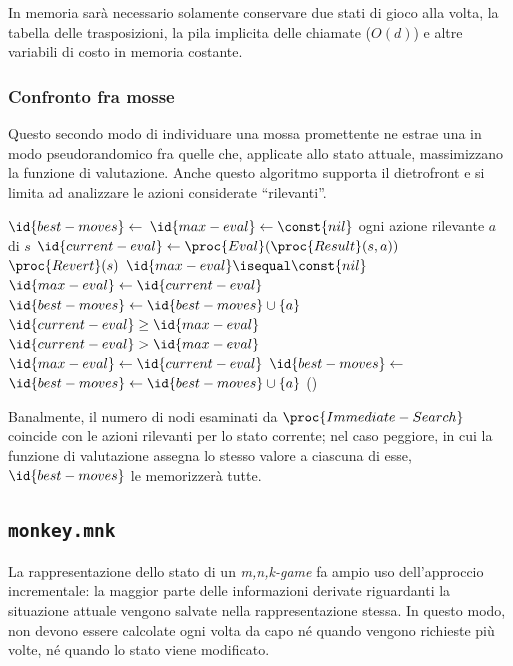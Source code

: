 \documentclass{article}
\begin{document}
In memoria sarà necessario solamente conservare due stati di gioco alla volta,
la tabella delle trasposizioni, la pila implicita delle chiamate ($O(d)$) e
altre variabili di costo in memoria costante.

\subsubsection{Confronto fra mosse}

Questo secondo modo di individuare una mossa promettente ne estrae una in modo
pseudorandomico fra quelle che, applicate allo stato attuale, massimizzano la
funzione di valutazione. Anche questo algoritmo supporta il dietrofront e si
limita ad analizzare le azioni considerate ``rilevanti''.

\begin{codebox}
  \li  $\id{best-moves} \gets$
       {\emph{}}
  \li  $\id{max-eval} \gets \const{nil}$
  \li \For ogni azione rilevante $a$ di $s$
  \li   \Do
          $\id{current-eval} \gets \proc{Eval}(\proc{Result}(s, a))$
  \li     $\proc{Revert}(s)$
  \li     \If $\id{max-eval} \isequal \const{nil}$
  \li       \Then
              $\id{max-eval} \gets \id{current-eval}$
  \li         $\id{best-moves} \gets \id{best-moves} \cup \{ a \}$
  \li     \ElseIf $\id{current-eval} \geq \id{max-eval}$
  \li       \Then
              \If $\id{current-eval} > \id{max-eval}$
  \li           \Then
                  $\id{max-eval} \gets \id{current-eval}$
  \li             $\id{best-moves} \gets$
                  {\emph{}}
                \End
  \li         $\id{best-moves} \gets \id{best-moves} \cup \{ a \}$
          \End
        \End
  \li  \Return {}()
\end{codebox}

Banalmente, il numero di nodi esaminati da $\proc{Immediate-Search}$ coincide
con le azioni rilevanti per lo stato corrente; nel caso peggiore, in cui la
funzione di valutazione assegna lo stesso valore a ciascuna di esse,
$\id{best-moves}$ le memorizzerà tutte.

\subsection{\texttt{monkey.mnk}}

La rappresentazione dello stato di un \emph{m,n,k-game} fa ampio uso
dell'approccio incrementale: la maggior parte delle informazioni derivate
riguardanti la situazione attuale vengono salvate nella rappresentazione stessa.
In questo modo, non devono essere calcolate ogni volta da capo né quando vengono
richieste più volte, né quando lo stato viene modificato.
\end{document}

